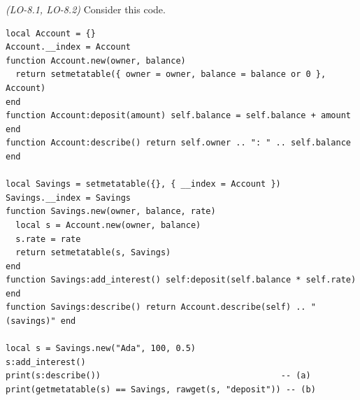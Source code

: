 \documentclass[11pt,addpoints]{exam}
\begin{document}
\begin{questions}
\question \textit{(LO-8.1, LO-8.2)} Consider this code.

\begin{lstlisting}
local Account = {}
Account.__index = Account
function Account.new(owner, balance)
  return setmetatable({ owner = owner, balance = balance or 0 }, Account)
end
function Account:deposit(amount) self.balance = self.balance + amount end
function Account:describe() return self.owner .. ": " .. self.balance end

local Savings = setmetatable({}, { __index = Account })
Savings.__index = Savings
function Savings.new(owner, balance, rate)
  local s = Account.new(owner, balance)
  s.rate = rate
  return setmetatable(s, Savings)
end
function Savings:add_interest() self:deposit(self.balance * self.rate) end
function Savings:describe() return Account.describe(self) .. " (savings)" end

local s = Savings.new("Ada", 100, 0.5)
s:add_interest()
print(s:describe())                                    -- (a)
print(getmetatable(s) == Savings, rawget(s, "deposit")) -- (b)
\end{lstlisting}

\end{questions}
\end{document}
